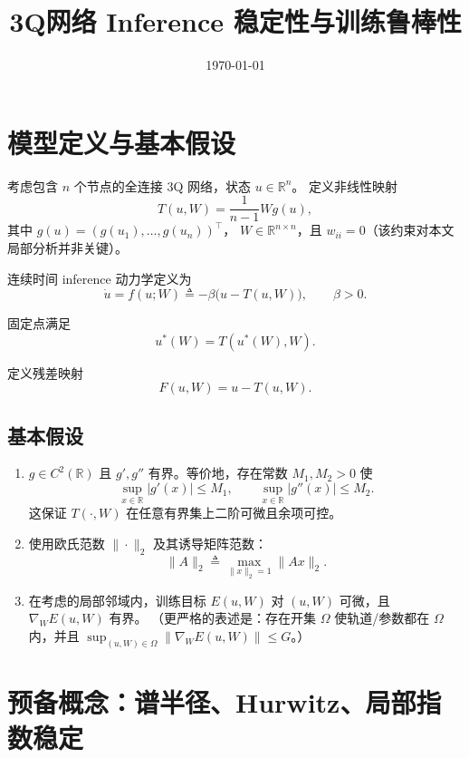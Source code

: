 \documentclass[11pt]{article}
\title{3Q网络 Inference 稳定性与训练鲁棒性}
\author{}
\date{\today}
\theoremstyle{plain}
\theoremstyle{remark}
\begin{document}
\maketitle

\section{模型定义与基本假设}

考虑包含 $n$ 个节点的全连接 3Q 网络，状态 $u\in\mathbb R^n$。
定义非线性映射
\begin{equation}\label{eq:T}
T(u,W) = \frac{1}{n-1}W g(u),
\end{equation}
其中 $g(u)=(g(u_1),\dots,g(u_n))^\top$，
$W\in\mathbb R^{n\times n}$，且 $w_{ii}=0$（该约束对本文局部分析并非关键）。

连续时间 inference 动力学定义为
\begin{equation}\label{eq:ode}
\dot u = f(u;W) \triangleq -\beta \big(u - T(u,W)\big), \qquad \beta>0.
\end{equation}

固定点满足
\begin{equation}\label{eq:fp}
u^*(W) = T(u^*(W),W).
\end{equation}

定义残差映射
\begin{equation}\label{eq:F}
F(u,W)=u-T(u,W).
\end{equation}

\subsection*{基本假设}

\begin{enumerate}
\item[\textbf{A1.}] $g\in C^2(\mathbb R)$ 且 $g',g''$ 有界。等价地，存在常数 $M_1,M_2>0$ 使
\[
\sup_{x\in\mathbb R}|g'(x)|\le M_1,\qquad \sup_{x\in\mathbb R}|g''(x)|\le M_2.
\]
这保证 $T(\cdot,W)$ 在任意有界集上二阶可微且余项可控。
\item[\textbf{A2.}] 使用欧氏范数 $\|\cdot\|_2$ 及其诱导矩阵范数：
\[
\|A\|_2\triangleq \max_{\|x\|_2=1}\|Ax\|_2.
\]
\item[\textbf{A3.}] 在考虑的局部邻域内，训练目标 $E(u,W)$ 对 $(u,W)$ 可微，且 $\nabla_W E(u,W)$ 有界。
（更严格的表述是：存在开集 $\Omega$ 使轨道/参数都在 $\Omega$ 内，并且 $\sup_{(u,W)\in\Omega}\|\nabla_W E(u,W)\|\le G$。）
\end{enumerate}

\section{预备概念：谱半径、Hurwitz、局部指数稳定}
\end{document}
